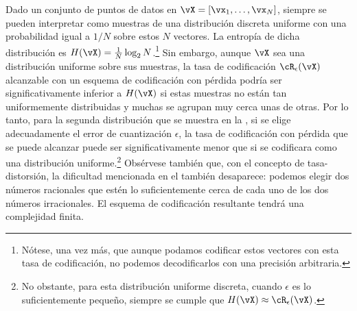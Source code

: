 \documentclass[../../book-main.tex]{subfiles}
\begin{document}
\begin{remark}
    Dado un conjunto de puntos de datos en $\vX = [\vx_1,\ldots, \vx_N]$, siempre se pueden
    interpretar como muestras de una distribución discreta uniforme con una probabilidad igual
    a $1/N$ sobre estos $N$ vectores. La entropía de dicha distribución
    es $H(\vX) = \frac{1}{N}\log_2 N$.\footnote{Nótese, una vez más, que aunque
        podamos codificar
        estos vectores con esta tasa de codificación, no podemos decodificarlos
        con una precisión
    arbitraria.} Sin embargo, aunque $\vX$ sea una distribución uniforme sobre
    sus muestras,
    la tasa de codificación $\cR_{\epsilon}(\vX)$ alcanzable con un esquema de codificación con pérdida
    podría ser significativamente inferior a $H(\vX)$ si estas muestras
    no están tan uniformemente
    distribuidas y muchas se agrupan muy cerca unas de otras. Por lo tanto, para la
    segunda distribución que se muestra en la , si se elige adecuadamente
    el error de cuantización  $\epsilon$, la tasa de codificación con pérdida que se puede alcanzar puede ser
    significativamente menor que si se codificara como una distribución 
    uniforme.\footnote{No obstante, para esta distribución uniforme discreta,
        cuando $\epsilon$ es lo suficientemente pequeño, siempre se cumple que $H(\vX) \approx
    \cR_{\epsilon}(\vX)$.} Obsérvese también que, con el concepto de 
    tasa-distorsión, la dificultad mencionada en el
     también desaparece: podemos elegir dos
    números racionales que estén lo suficientemente cerca de cada uno de los dos
    números irracionales. El esquema de codificación resultante tendrá una
    complejidad finita.
\end{remark}
\end{document}
